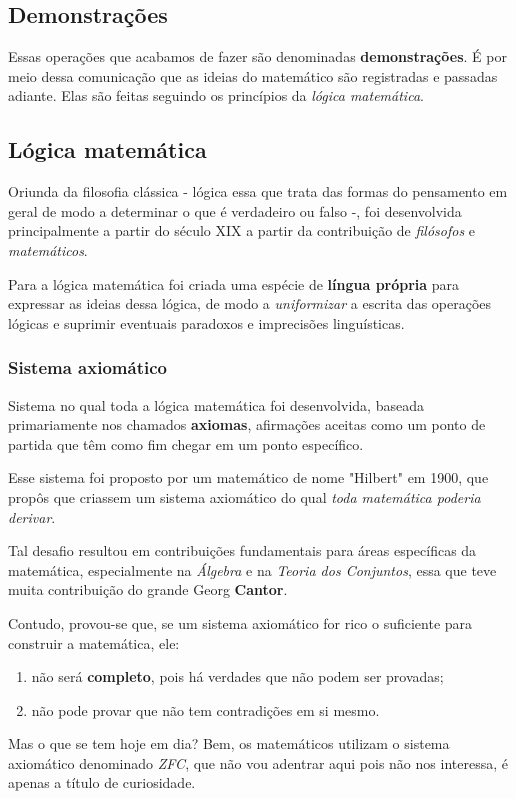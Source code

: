\documentclass{article}
\begin{document}
\subsection{Demonstrações}
Essas operações que acabamos de fazer são denominadas \textbf{demonstrações}. É por meio dessa comunicação que as ideias do matemático são registradas e passadas adiante. Elas são feitas seguindo os princípios da \emph{lógica matemática}.

\subsection{Lógica matemática}
Oriunda da filosofia clássica - lógica essa que trata das formas do pensamento em geral de modo a determinar o que é verdadeiro ou falso -, foi desenvolvida principalmente a partir do século XIX a partir da contribuição de \emph{filósofos} e \emph{matemáticos}.
\par
Para a lógica matemática foi criada uma espécie de \textbf{língua própria} para expressar as ideias dessa lógica, de modo a \emph{uniformizar} a escrita das operações lógicas e suprimir eventuais paradoxos e imprecisões linguísticas.
\subsubsection{Sistema axiomático}
Sistema no qual toda a lógica matemática foi desenvolvida, baseada primariamente nos chamados \textbf{axiomas}, afirmações aceitas como um ponto de partida que têm como fim chegar em um ponto específico.
\par
Esse sistema foi proposto por um matemático de nome "Hilbert" em 1900, que propôs que criassem um sistema axiomático do qual \emph{toda matemática poderia derivar}.
\par
Tal desafio resultou em contribuições fundamentais para áreas específicas da matemática, especialmente na \emph{Álgebra} e na \emph{Teoria dos Conjuntos}, essa que teve muita contribuição do grande Georg \textbf{Cantor}.
\par
Contudo, provou-se que, se um sistema axiomático for rico o suficiente para construir a matemática, ele:
\begin{enumerate}
    \item não será \textbf{completo}, pois há verdades que não podem ser provadas;
    \item não pode provar que não tem contradições em si mesmo.
\end{enumerate}
\par
Mas o que se tem hoje em dia? Bem, os matemáticos utilizam o sistema axiomático denominado \emph{ZFC}, que não vou adentrar aqui pois não nos interessa, é apenas a título de curiosidade.
\end{document}

